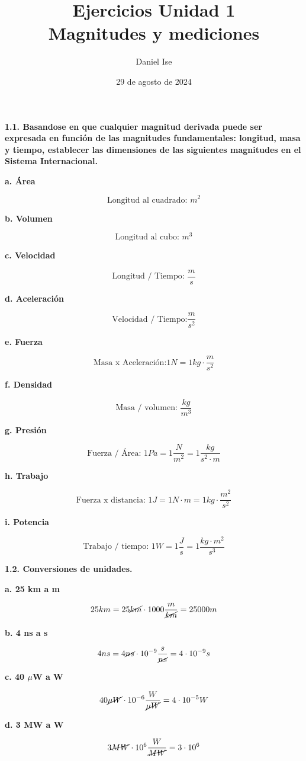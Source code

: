 \documentclass{article}
\title{Ejercicios Unidad 1\\Magnitudes y mediciones}
\author{Daniel Ise}
\date{29 de agosto de 2024}
\begin{document}
\maketitle

\textbf{1.1. Basandose en que cualquier magnitud derivada puede ser expresada en 
función de las magnitudes fundamentales: longitud, masa y tiempo, establecer las
dimensiones de las siguientes magnitudes en el Sistema Internacional.}

\textbf{a. Área}

\[\text{Longitud al cuadrado: }m^{2}\]

\textbf{b. Volumen}

\[\text{Longitud al cubo: }m^{3}\]

\textbf{c. Velocidad}

\[\text{Longitud / Tiempo: }\frac{m}{s}\]

\textbf{d. Aceleración}

\[\text{Velocidad / Tiempo:} \frac{m}{s^{2}}\]

\textbf{e. Fuerza}

\[\text{Masa x Aceleración:} 1 N = 1 kg \cdot \frac{m}{s^{2}}\]

\textbf{f. Densidad}

\[\text{Masa / volumen: }\frac{kg}{m^{3}}\]

\textbf{g. Presión}

\[\text{Fuerza / Área: }1 Pa = 1 \frac{N}{m^{2}} = 1 \frac{kg}{s^{2} \cdot m}\]

\textbf{h. Trabajo}

\[\text{Fuerza x distancia: }1 J = 1 N \cdot m = 1 kg \cdot \frac{m^{2}}{s^{2}}\]

\textbf{i. Potencia}

\[\text{Trabajo / tiempo: }1 W = 1 \frac{J}{s} = 1 \frac{kg \cdot m^{2}}{s^{3}}\]

\hfill

\textbf{1.2. Conversiones de unidades.}

\textbf{a. 25 km a m}

\[25 km = 25 \cancel{km} \cdot 1000 \frac{m}{\cancel{km}} = 25 000 m\]

\textbf{b. 4 ns a s}

\[4 ns = 4 \cancel{ns} \cdot 10^{-9} \frac{s}{\cancel{ns}} = 4 \cdot 10^{-9} s\]

\textbf{c. 40 \(\mu\)W a W}

\[40 \cancel{\mu W} \cdot 10^{-6} \frac{W}{\cancel{\mu W}} = 4 \cdot 10^{-5} W\]

\textbf{d. 3 MW a W}

\[3 \cancel{MW} \cdot 10^{6} \frac{W}{\cancel{MW}} = 3 \cdot 10^{6}\]
\end{document}
